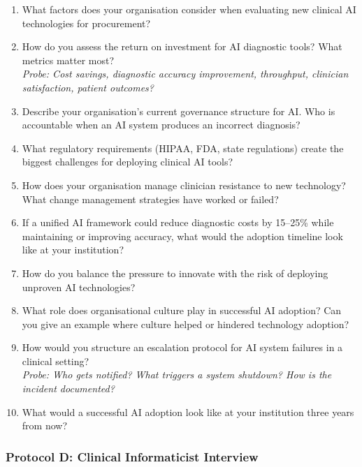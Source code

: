 \begin{enumerate}[label=\textbf{AD\arabic*.}, leftmargin=2cm]
    \item What factors does your organisation consider when evaluating new clinical AI technologies for procurement?
    \item How do you assess the return on investment for AI diagnostic tools? What metrics matter most? \\
    \textit{Probe: Cost savings, diagnostic accuracy improvement, throughput, clinician satisfaction, patient outcomes?}
    \item Describe your organisation's current governance structure for AI. Who is accountable when an AI system produces an incorrect diagnosis?
    \item What regulatory requirements (HIPAA, FDA, state regulations) create the biggest challenges for deploying clinical AI tools?
    \item How does your organisation manage clinician resistance to new technology? What change management strategies have worked or failed?
    \item If a unified AI framework could reduce diagnostic costs by 15--25\% while maintaining or improving accuracy, what would the adoption timeline look like at your institution?
    \item How do you balance the pressure to innovate with the risk of deploying unproven AI technologies?
    \item What role does organisational culture play in successful AI adoption? Can you give an example where culture helped or hindered technology adoption?
    \item How would you structure an escalation protocol for AI system failures in a clinical setting? \\
    \textit{Probe: Who gets notified? What triggers a system shutdown? How is the incident documented?}
    \item What would a successful AI adoption look like at your institution three years from now?
\end{enumerate}

\subsubsection{Protocol D: Clinical Informaticist Interview}


